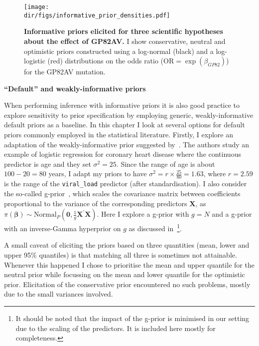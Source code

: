 \begin{figure}[!ht]
  \centering
  \texttt{[image: \\dir/figs/informative\_prior\_densities.pdf]}
  \caption[Informative priors for the effect of GP82AV]{\textbf{Informative priors elicited for three scientific hypotheses about the effect of GP82AV.}
  I show conservative, neutral and optimistic priors constructed using a log-normal (black) and a log-logistic (red) distributions on the odds ratio ($\text{OR} = \exp(\beta_{GP82})$) for the GP82AV mutation.
  }
  \label{fig:informativePriors}
\end{figure}

\textbf{``Default'' and weakly-informative priors}

When performing inference with informative priors it is also good practice to explore sensitivity to prior specification by employing generic, weakly-informative default priors as a baseline.
In this chapter I look at several options for default priors commonly employed in the statistical literature.
Firstly, I explore an adaptation of the weakly-informative prior suggested by~\cite{Seaman2012}.
The authors study an example of logistic regression for coronary heart disease where the continuous predictor is age and they set $\sigma^2 = 25$.
Since the range of age is about $100-20 = 80$ years, I adapt my priors to have $\sigma^2 = r \times \frac{25}{80} = 1.63$, where $r = 2.59$ is the range of the \verb|viral_load| predictor (after standardisation).
I also consider the so-called g-prior~\citep{Zellner1986}, which scales the covariance matrix between coefficients proportional to the variance of the corresponding predictors $\boldsymbol X$, as $\pi(\boldsymbol\beta) \sim \text{Normal}_P(\boldsymbol 0, \frac{1}{g} \boldsymbol X^\prime\boldsymbol X)$.
Here I explore a g-prior with $g = N$ and a g-prior with an inverse-Gamma hyperprior on $g$ as discussed in~\cite{Liang2008}\footnote{It should be noted that the impact of the g-prior is minimised in our setting due to the scaling of the predictors. It is included here mostly for completeness.}.

A small caveat of eliciting the priors based on three quantities (mean, lower and upper 95\% quantiles) is that matching all three is sometimes not attainable.
Whenever this happened I chose to prioritise the mean and upper quantile for the neutral prior while focussing on the mean and lower quantile for the optimistic prior.
Elicitation  of the conservative prior encountered no such problems, mostly due to the small variances involved.

